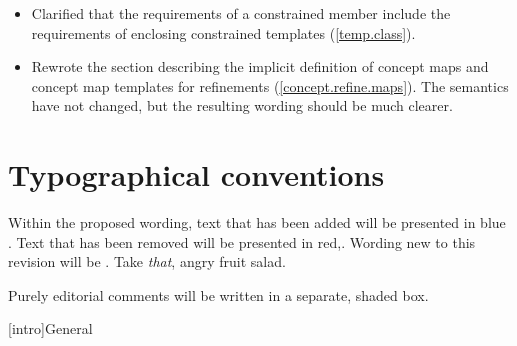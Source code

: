 \documentclass[american]{book}
\newcommand{\editorial}[1]{\colorbox{editbackground}{\begin{minipage}{\linewidth
}#1\end{minipage}}}
\begin{document}
\begin{titlepage}
\begin{itemize}
\item Clarified that the requirements of a constrained member include
  the requirements of enclosing constrained templates
  (\ref{temp.class}).

\item Rewrote the section describing the implicit definition of
  concept maps and concept map templates for refinements
  (\ref{concept.refine.maps}). The semantics have not changed, but the
  resulting wording should be much clearer.
\end{itemize}

\section*{Typographical conventions}
Within the proposed wording, text that has been added
\textcolor{addclr}{will be presented in blue} . Text that has been removed will be
presented \textcolor{remclr}{in red},. Wording new to this revision will be 
. Take \emph{that}, angry fruit salad.

\editorial{Purely editorial comments will be written in a separate,
  shaded box.}
\end{titlepage}

\pagestyle{fancy}
\fancyhead[LE,RO]{\textbf{\rightmark}}
\fancyhead[RE]{\textbf{\leftmark\hspace{1em}\thepage}}
\fancyhead[LO]{\textbf{\thepage\hspace{1em}\leftmark}}


\renewcommand{\sectionmark}[1]{\markright{\thesection\hspace{1em}#1}}
\renewcommand{\chaptermark}[1]{\markboth{#1}{}}

[intro]{General}
\end{document}
